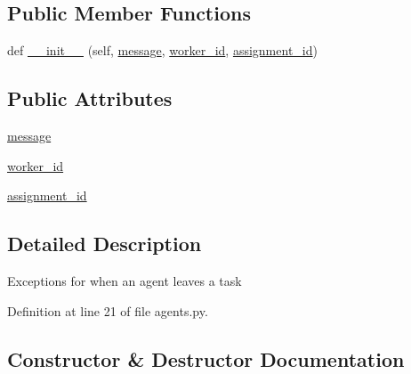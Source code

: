 \subsection*{Public Member Functions}
\begin{DoxyCompactItemize}
\item 
def \hyperlink{classparlai_1_1mturk_1_1core_1_1dev_1_1agents_1_1AbsentAgentError_a1094e79da4d129d6b135fcabbe0175e0}{\+\_\+\+\_\+init\+\_\+\+\_\+} (self, \hyperlink{classparlai_1_1mturk_1_1core_1_1dev_1_1agents_1_1AbsentAgentError_a469a3b342c2877da0824bc08c0a91c54}{message}, \hyperlink{classparlai_1_1mturk_1_1core_1_1dev_1_1agents_1_1AbsentAgentError_a26db50c87a5d4954907d538de3da875c}{worker\+\_\+id}, \hyperlink{classparlai_1_1mturk_1_1core_1_1dev_1_1agents_1_1AbsentAgentError_ab9cf020196d28024b307c41a3fff6be1}{assignment\+\_\+id})
\end{DoxyCompactItemize}
\subsection*{Public Attributes}
\begin{DoxyCompactItemize}
\item 
\hyperlink{classparlai_1_1mturk_1_1core_1_1dev_1_1agents_1_1AbsentAgentError_a469a3b342c2877da0824bc08c0a91c54}{message}
\item 
\hyperlink{classparlai_1_1mturk_1_1core_1_1dev_1_1agents_1_1AbsentAgentError_a26db50c87a5d4954907d538de3da875c}{worker\+\_\+id}
\item 
\hyperlink{classparlai_1_1mturk_1_1core_1_1dev_1_1agents_1_1AbsentAgentError_ab9cf020196d28024b307c41a3fff6be1}{assignment\+\_\+id}
\end{DoxyCompactItemize}


\subsection{Detailed Description}
\begin{DoxyVerb}Exceptions for when an agent leaves a task\end{DoxyVerb}
 

Definition at line 21 of file agents.\+py.



\subsection{Constructor \& Destructor Documentation}
\mbox{\label{classparlai_1_1mturk_1_1core_1_1dev_1_1agents_1_1AbsentAgentError_a1094e79da4d129d6b135fcabbe0175e0}} 
